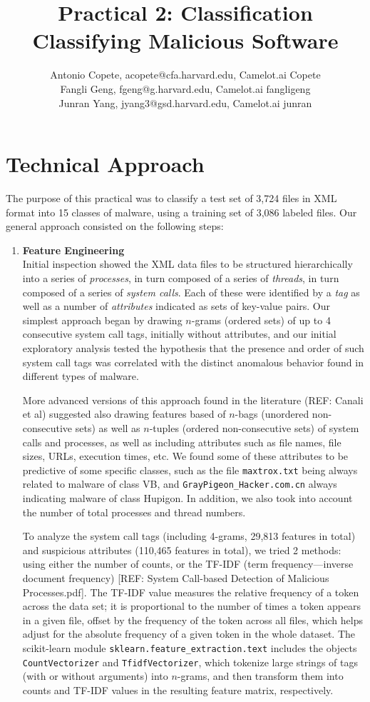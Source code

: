 \documentclass[11pt]{article}
\title{Practical 2: Classification\\ Classifying Malicious Software}
\author{Antonio Copete, acopete@cfa.harvard.edu, Camelot.ai Copete \\
	Fangli Geng, fgeng@g.harvard.edu, Camelot.ai fangligeng\\
	Junran Yang, jyang3@gsd.harvard.edu, Camelot.ai junran}
\begin{document}
\maketitle{}


\section{Technical Approach}

The purpose of this practical was to classify a test set of 3,724 files in XML format into 15 classes of malware, using a training set of 3,086 labeled files. Our general approach consisted on the following steps:

\begin{enumerate}
\item \textbf{Feature Engineering}\\
Initial inspection showed the XML data files to be structured hierarchically into a series of \emph{processes}, in turn composed of a series of \emph{threads}, in turn composed of a series of \emph{system calls}. Each of these were identified by a \emph{tag} as well as a number of \emph{attributes} indicated as sets of key-value pairs. Our simplest approach began by drawing $n$-grams (ordered sets) of up to 4 consecutive system call tags, initially without attributes, and our initial exploratory analysis tested the hypothesis that the presence and order of such system call tags was correlated with the distinct anomalous behavior found in different types of malware.

More advanced versions of this approach found in the literature (REF: Canali et al) suggested also drawing features based of $n$-bags (unordered non-consecutive sets) as well as $n$-tuples (ordered non-consecutive sets) of system calls and processes, as well as including attributes such as file names, file sizes, URLs, execution times, etc. We found some of these attributes to be predictive of some specific classes, such as the file \verb|maxtrox.txt| being always related to malware of class VB, and \verb|GrayPigeon_Hacker.com.cn| always indicating malware of class Hupigon. In addition, we also took into account the number of total processes and thread numbers.

To analyze the system call tags (including 4-grams, 29,813 features in total) and suspicious attributes (110,465 features in total), we tried 2 methods: using either the number of counts, or the TF-IDF (term frequency---inverse document frequency) [REF: System Call-based Detection of Malicious Processes.pdf]. The TF-IDF value measures the relative frequency of a token across the data set; it is proportional to the number of times a token appears in a given file, offset by the frequency of the token across all files, which helps adjust for the absolute frequency of a given token in the whole dataset. The scikit-learn module \verb|sklearn.feature_extraction.text| includes the objects \verb|CountVectorizer| and \verb|TfidfVectorizer|, which tokenize large strings of tags (with or without arguments) into $n$-grams, and then transform them into counts and TF-IDF values in the resulting feature matrix, respectively.



\end{enumerate}
\end{document}
